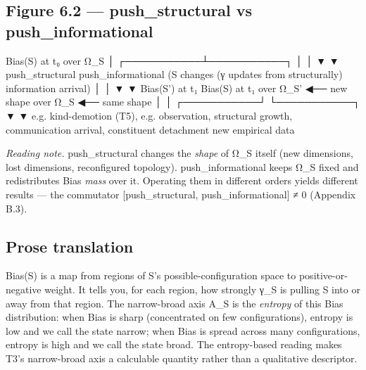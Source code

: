 \documentclass[11pt, openany]{book}
\begin{document}
\subsection{Figure 6.2 --- push\_\allowbreak{}structural vs push\_\allowbreak{}informational}

\begin{Code}
                       Bias(S) at t₀
                           over Ω_S
                              │
                  ┌───────────┴───────────┐
                  │                       │
                  ▼                       ▼
         push_structural          push_informational
         (S changes               (γ updates from
          structurally)            information arrival)
                  │                       │
                  ▼                       ▼
         Bias(S') at t₁            Bias(S) at t₁
         over Ω_S'  ◀── new shape  over Ω_S  ◀── same shape
                  │                       │
      ┌───────────┘                       └───────────┐
      ▼                                               ▼
  e.g. kind-demotion (T5),               e.g. observation,
  structural growth,                     communication arrival,
  constituent detachment                 new empirical data
\end{Code}

\textit{Reading note.} push\_\allowbreak{}structural changes the \textit{shape} of Ω\_\allowbreak{}S itself (new dimensions, lost dimensions, reconfigured topology). push\_\allowbreak{}informational keeps Ω\_\allowbreak{}S fixed and redistributes Bias \textit{mass} over it. Operating them in different orders yields different results --- the commutator [push\_\allowbreak{}structural, push\_\allowbreak{}informational] ≠ 0 (Appendix B.3).

\subsection{Prose translation}

Bias(S) is a map from regions of S's possible-configuration space to positive-or-negative weight. It tells you, for each region, how strongly γ\_\allowbreak{}S is pulling S into or away from that region. The narrow-broad axis A\_\allowbreak{}S is the \textit{entropy} of this Bias distribution: when Bias is sharp (concentrated on few configurations), entropy is low and we call the state narrow; when Bias is spread across many configurations, entropy is high and we call the state broad. The entropy-based reading makes T3's narrow-broad axis a calculable quantity rather than a qualitative descriptor.
\end{document}
